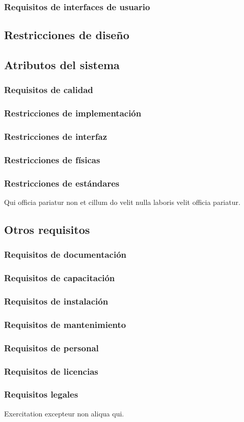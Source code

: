 \subsubsection{Requisitos de interfaces de usuario}

\subsection{Restricciones de diseño}
\subsection{Atributos del sistema}
\subsubsection{Requisitos de calidad}
\subsubsection{Restricciones de implementación}
\subsubsection{Restricciones de interfaz}
\subsubsection{Restricciones de físicas}
\subsubsection{Restricciones de estándares}
Qui officia pariatur non et cillum do velit nulla laboris velit officia pariatur.

\subsection{Otros requisitos}
\subsubsection{Requisitos de documentación}
\subsubsection{Requisitos de capacitación}
\subsubsection{Requisitos de instalación}
\subsubsection{Requisitos de mantenimiento}
\subsubsection{Requisitos de personal}
\subsubsection{Requisitos de licencias}
\subsubsection{Requisitos legales}
Exercitation excepteur non aliqua qui.